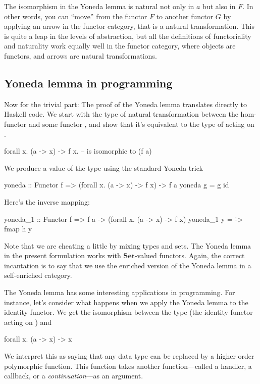 \documentclass[DaoFP]{subfiles}
\begin{document}
The isomorphism in the Yoneda lemma is natural not only in $a$ but also in $F$. In other words, you can ``move'' from the functor $F$ to another functor $G$ by applying an arrow in the functor category, that is a natural transformation. This is quite a leap in the levels of abstraction, but all the definitions of functoriality and naturality work equally well in the functor category, where objects are functors, and arrows are natural transformations.

\subsection{Yoneda lemma in programming}

Now for the trivial part: The proof of the Yoneda lemma translates directly to Haskell code. We start with the type of natural transformation between the hom-functor  and some functor , and show that it's equivalent to the type of  acting on .
\begin{haskell}
forall x. (a -> x) -> f x.   -- is isomorphic to (f a)
\end{haskell}
We produce a value of the type  using the standard Yoneda trick
\begin{haskell}
yoneda :: Functor f => (forall x. (a -> x) -> f x) -> f a
yoneda g = g id
\end{haskell}
Here's the inverse mapping:
\begin{haskell}
yoneda_1 :: Functor f => f a -> (forall x. (a -> x) -> f x)
yoneda_1 y = \h -> fmap h y
\end{haskell}

Note that we are cheating a little by mixing types and sets. The Yoneda lemma in the present formulation works with  $\mathbf{Set}$-valued functors. Again, the correct incantation is to say that we use the enriched version of the Yoneda lemma in a self-enriched category.

The Yoneda lemma has some interesting applications in programming. For instance, let's consider what happens when we apply the Yoneda lemma to the identity functor. We get the isomorphism between the type  (the identity functor acting on ) and
\begin{haskell}
forall x. (a -> x) -> x
\end{haskell}
We interpret this as saying that any data type  can be replaced by a higher order polymorphic function. This function takes another function---called a handler, a callback, or a \emph{continuation}---as an argument. 
\end{document}
